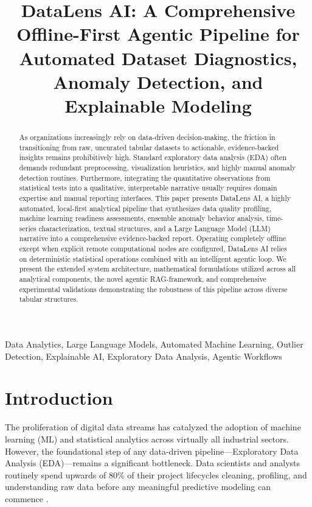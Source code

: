 \documentclass[conference]{IEEEtran}
\begin{document}
\title{DataLens AI: A Comprehensive Offline-First Agentic Pipeline for Automated Dataset Diagnostics, Anomaly Detection, and Explainable Modeling}

\author{
}

\maketitle

\begin{abstract}
As organizations increasingly rely on data-driven decision-making, the friction in transitioning from raw, uncurated tabular datasets to actionable, evidence-backed insights remains prohibitively high. Standard exploratory data analysis (EDA) often demands redundant preprocessing, visualization heuristics, and highly manual anomaly detection routines. Furthermore, integrating the quantitative observations from statistical tests into a qualitative, interpretable narrative usually requires domain expertise and manual reporting interfaces. This paper presents DataLens AI, a highly automated, local-first analytical pipeline that synthesizes data quality profiling, machine learning readiness assessments, ensemble anomaly behavior analysis, time-series characterization, textual structures, and a Large Language Model (LLM) narrative into a comprehensive evidence-backed report. Operating completely offline except when explicit remote computational nodes are configured, DataLens AI relies on deterministic statistical operations combined with an intelligent agentic loop. We present the extended system architecture, mathematical formulations utilized across all analytical components, the novel agentic RAG-framework, and comprehensive experimental validations demonstrating the robustness of this pipeline across diverse tabular structures.
\end{abstract}

\begin{IEEEkeywords}
Data Analytics, Large Language Models, Automated Machine Learning, Outlier Detection, Explainable AI, Exploratory Data Analysis, Agentic Workflows
\end{IEEEkeywords}

\section{Introduction}
The proliferation of digital data streams has catalyzed the adoption of machine learning (ML) and statistical analytics across virtually all industrial sectors. However, the foundational step of any data-driven pipeline---Exploratory Data Analysis (EDA)---remains a significant bottleneck. Data scientists and analysts routinely spend upwards of 80\% of their project lifecycles cleaning, profiling, and understanding raw data before any meaningful predictive modeling can commence \cite{kandel2012}. 
\end{document}
